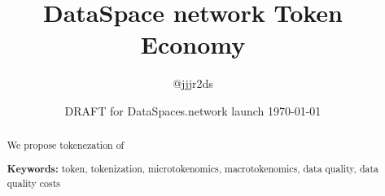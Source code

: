 \documentclass{amsart}
\title{DataSpace network Token Economy}
\author{@jjjr2ds}
\date{DRAFT for DataSpaces.network launch \today}
\begin{document}
	\begin{abstract}

		We propose tokenezation of 

		\noindent\textbf {Keywords:} token, tokenization, microtokenomics, macrotokenomics, data quality, data quality costs

	\end{abstract}

\maketitle
\tableofcontents









\end{document}

